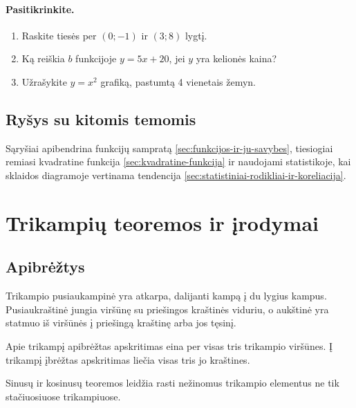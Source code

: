 \paragraph{Pasitikrinkite.}
\begin{enumerate}
\item Raskite tiesės per $(0;-1)$ ir $(3;8)$ lygtį.
\item Ką reiškia $b$ funkcijoje $y=5x+20$, jei $y$ yra kelionės kaina?
\item Užrašykite $y=x^2$ grafiką, pastumtą 4 vienetais žemyn.
\end{enumerate}

\subsection{Ryšys su kitomis temomis}

Sąryšiai apibendrina funkcijų sampratą \ref{sec:funkcijos-ir-ju-savybes}, tiesiogiai remiasi kvadratine funkcija \ref{sec:kvadratine-funkcija} ir naudojami statistikoje, kai sklaidos diagramoje vertinama tendencija \ref{sec:statistiniai-rodikliai-ir-koreliacija}.

\section{Trikampių teoremos ir įrodymai}\label{sec:trikampiu-teoremos-ir-irodymai}

\subsection{Apibrėžtys}

\begin{apibreztis}
Trikampio pusiaukampinė yra atkarpa, dalijanti kampą į du lygius kampus. Pusiaukraštinė jungia viršūnę su priešingos kraštinės viduriu, o aukštinė yra statmuo iš viršūnės į priešingą kraštinę arba jos tęsinį.
\end{apibreztis}

\begin{apibreztis}
Apie trikampį apibrėžtas apskritimas eina per visas tris trikampio viršūnes. Į trikampį įbrėžtas apskritimas liečia visas tris jo kraštines.
\end{apibreztis}

\begin{apibreztis}
Sinusų ir kosinusų teoremos leidžia rasti nežinomus trikampio elementus ne tik stačiuosiuose trikampiuose.
\end{apibreztis}


